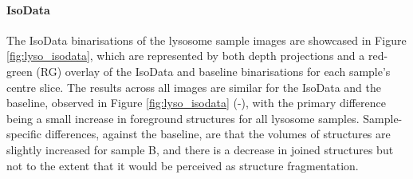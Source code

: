 \paragraph{IsoData} The IsoData binarisations of the lysosome sample images are showcased in Figure \ref{fig:lyso_isodata}, which are represented by both depth projections and a red-green (RG) overlay of the IsoData and baseline binarisations for each sample's centre slice. The results across all images are similar for the IsoData and the baseline, observed in Figure \ref{fig:lyso_isodata} (-), with the primary difference being a small increase in foreground structures for all lysosome samples. Sample-specific differences, against the baseline, are that the volumes of structures are slightly increased for sample B, and there is a decrease in joined structures but not to the extent that it would be perceived as structure fragmentation.

